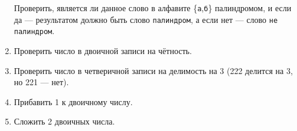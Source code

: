 \documentclass[12pt,a4paper,oneside]{article}
\newcommand{\s}[1]{\texttt{#1}}
\begin{document}
\begin{enumerate}
Проверить, является ли данное слово в алфавите \{\s{а},\s{б}\} 
палиндромом, и если да --- результатом должно быть слово \s{палиндром}, 
а если нет --- слово \s{не палиндром}.

\item Проверить число в двоичной записи на чётность.
\item Проверить число в четверичной записи на делимость на 3 (222 делится на 3, но 221 --- нет).

\item Прибавить 1 к двоичному числу.

\item Сложить 2 двоичных числа.
\end{enumerate}

%
%
%
%
%
%
%
%
\end{document}

